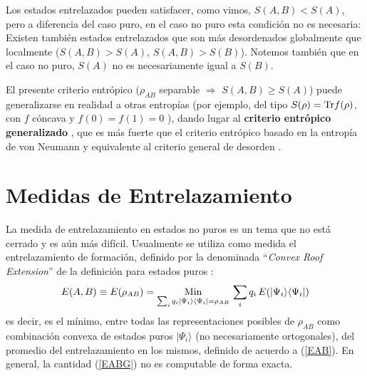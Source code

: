 Los estados entrelazados  pueden satisfacer, como vimos, $S(A,B)<S(A)$, pero a diferencia del caso puro, en el caso no puro esta condición no es necesaria: Existen también estados
entrelazados que son más desordenados globalmente que localmente ($S(A,B)>S(A)$,
$S(A,B)>S(B)$). 
Notemos también que en el caso no puro, $S(A)$ no es necesariamente igual a $S(B)$.

El presente criterio entrópico ($\rho_{AB}$ separable $\Rightarrow$
$S(A,B)\geq S(A)$) puede generalizarse en realidad a otras entropías (por ejemplo, del tipo
$S(\rho)={\rm Tr}f(\rho)$, con $f$ c\'oncava y $f(0)=f(1)=0$ \cite{CR.02}), dando lugar al {\bf criterio entrópico generalizado} \cite{RC.02}, que es más
fuerte que el criterio entrópico basado en la entropía de von Neumann
\cite{Ho.96} y equivalente al criterio general de desorden \cite{NK.01}. 

\section{Medidas de Entrelazamiento}

La medida de entrelazamiento en estados no puros es un tema que no está
cerrado y es aún más difícil. Usualmente se utiliza como medida el entrelazamiento de formación, 
definido por la denominada ``{\it Convex Roof Extension}'' de la definición para
estados puros \cite{V.07,BDSW.96}:
\begin{equation}
 E(A,B)\equiv E(\rho_{AB})=\mathop{\rm Min}_{\sum_i q_i|\Psi_i\rangle\langle \Psi_i|=\rho_{AB}}\,
 \sum_i q_i\,E(|\Psi_i\rangle\langle\Psi_i|)\label{EABG}\end{equation}
es decir, es el mínimo, entre todas las representaciones posibles  de
$\rho_{AB}$ como combinación convexa de estados puros $|\Psi_i\rangle$ (no necesariamente ortogonales), del promedio del entrelazamiento en los mismos, 
 definido de acuerdo a (\ref{EAB}). En general, la cantidad (\ref{EABG})
no es computable de forma exacta. 

